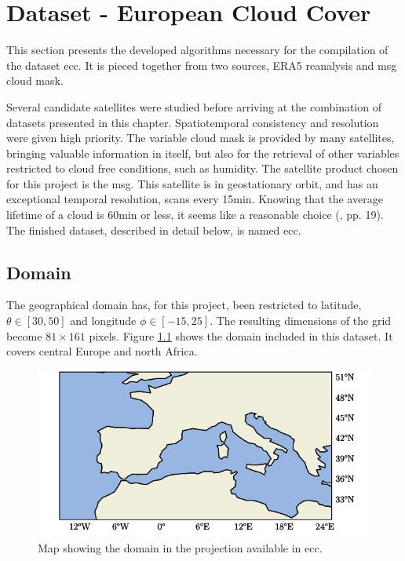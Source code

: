 \chapter{Dataset - European Cloud Cover }
This section presents the developed algorithms necessary for the compilation of the dataset \acrfull{ecc}. It is pieced together from two sources, ERA5 reanalysis and \acrlong{msg} cloud mask.

Several candidate satellites were studied before arriving at the combination of datasets presented in this chapter. Spatiotemporal consistency and resolution were given high priority. The variable cloud mask is provided by many satellites, bringing valuable information in itself, but also for the retrieval of other variables restricted to cloud free conditions, such as humidity. The satellite product chosen for this project is the \acrfull{msg}. This satellite is in geostationary orbit, and has an exceptional temporal resolution, scans every 15min. Knowing that the average lifetime of a cloud is 60min or less, it seems like a reasonable choice (\cite{lohmann2016}, pp. 19). The finished dataset, described in detail below, is named \acrfull{ecc}.

\section{Domain}
The geographical domain has, for this project, been restricted to latitude, $\theta \in[30,50]$ and longitude $\phi \in [-15, 25]$. The resulting dimensions of the grid become $81\times161$ pixels. Figure \ref{fig:map} shows the domain included in this dataset. It covers central Europe and north Africa.
\begin{figure}[h]
    \centering
    \includegraphics[scale = 1.0]{python_figs/Domain.png}
    \caption[Map over domain.]{Map showing the domain in the projection available in \acrshort{ecc}.}
    \label{fig:map}
\end{figure}

